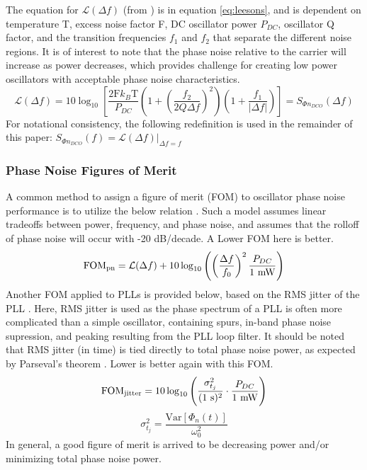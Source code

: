 		The equation for $\mathcal{L}(\Delta f)$ (from \cite{lee_hajimiri_2000}) is in equation \ref{eq:leesons}, and is dependent on temperature T, excess noise factor F, DC oscillator power $P_{DC}$, oscillator Q factor, and the transition frequencies $f_1$ and $f_2$ that separate the different noise regions. It is of interest to note that the phase noise relative to the carrier will increase as power decreases, which provides challenge for creating low power oscillators with acceptable phase noise characteristics. 
		\begin{equation}\label{eq:leesons}
		\mathcal{L}(\Delta f) = 10\log_{10}\left[\frac{2\text{F}k_B\text{T}}{P_{DC}}\left(1+\left(\frac{f_2}{2Q\Delta f}\right)^2\right)\left(1+\frac{f_1}{|\Delta f|}\right)\right] = S_{\Phi n_{DCO}}(\Delta f)
		\end{equation}
		For notational consistency, the following redefinition is used in the remainder of this paper: $S_{\Phi n_{DCO}}(f) = \mathcal{L}(\Delta f)|_{\Delta f = f}$

	\subsubsection{Phase Noise Figures of Merit}
	A common method to assign a figure of merit (FOM) to oscillator phase noise performance is to utilize the below relation \cite{Kinget1999}. Such a model assumes linear tradeoffs between power, frequency, and phase noise, and assumes that the rolloff of phase noise will occur with -20 dB/decade. A Lower FOM here is better.
	\begin{equation}\label{eq:fom_pn}
		\textnormal{FOM}_{\textnormal{pn}} =  \mathcal{L}(\Delta f) + 10\log_{10}\left(\left(\frac{\Delta f}{f_0}\right)^2 \frac{P_{DC}}{\textnormal{1 mW}} \right)
	\end{equation}
	Another FOM applied to PLLs is provided below, based on the RMS jitter of the PLL \cite{XiangGao2009}. Here, RMS jitter is used as the phase spectrum of a PLL is often more complicated than a simple oscillator, containing spurs, in-band phase noise supression, and peaking resulting from the PLL loop filter. It should be noted that RMS jitter (in time) is tied directly to total phase noise power, as expected by Parseval's theorem \cite{parseval_1799}.  Lower is better again with this FOM. 
	\begin{equation}\label{eq:fom_jitter}
		\textnormal{FOM}_{\textnormal{jitter}} = 10\log_{10}\left(\frac{\sigma_{t_j}^2}{(\textnormal{1 s})^2}\cdot\frac{P_{DC}}{\textnormal{1 mW}}\right)
	\end{equation}
	\begin{equation}
		\sigma_{t_j}^2 = \frac{\mathrm{Var}[\Phi_{n}(t)]}{\omega_0^2}
	\end{equation}
	In general, a good figure of merit is arrived to be decreasing power and/or minimizing total phase noise power. 
	
